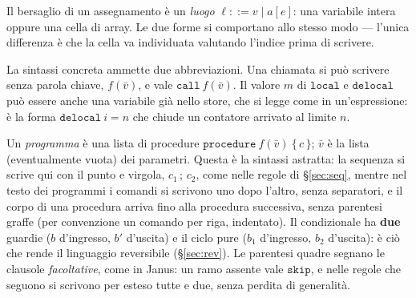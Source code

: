 \begin{itemize}
\noindent
Il bersaglio di un assegnamento è un \emph{luogo} $\ell ::= v \mid a[e]$: una
variabile intera oppure una cella di array. Le due forme si comportano allo
stesso modo — l'unica differenza è che la cella va individuata valutando
l'indice prima di scrivere.

\noindent
La sintassi concreta ammette due abbreviazioni. Una chiamata si può scrivere
senza parola chiave, $f(\bar v)$, e vale $\mathtt{call}\ f(\bar v)$. Il valore
$m$ di $\mathtt{local}$ e $\mathtt{delocal}$ può essere anche una variabile già
nello store, che si legge come in un'espressione: è la forma
$\mathtt{delocal}\ i = n$ che chiude un contatore arrivato al limite $n$.

\noindent
Un \emph{programma} è una lista di procedure
$\mathtt{procedure}\ f(\bar v)\ \{\, c \,\}$; $\bar v$ è la lista (eventualmente
vuota) dei parametri. Questa è la sintassi astratta: la sequenza si scrive qui
con il punto e virgola, $c_1\,;\,c_2$, come nelle regole di \S\ref{sec:seq},
mentre nel testo dei programmi i comandi si scrivono uno dopo l'altro, senza
separatori, e il corpo di una procedura arriva fino alla procedura successiva,
senza parentesi graffe (per convenzione un comando per riga, indentato). Il condizionale ha
\textbf{due} guardie ($b$ d'ingresso, $b'$ d'uscita) e il ciclo pure ($b_1$
d'ingresso, $b_2$ d'uscita): è ciò che rende il linguaggio reversibile
(\S\ref{sec:rev}). Le parentesi quadre segnano le clausole \emph{facoltative},
come in Janus: un ramo assente vale $\mathtt{skip}$, e nelle regole che seguono
si scrivono per esteso tutte e due, senza perdita di generalità.


\end{itemize}

